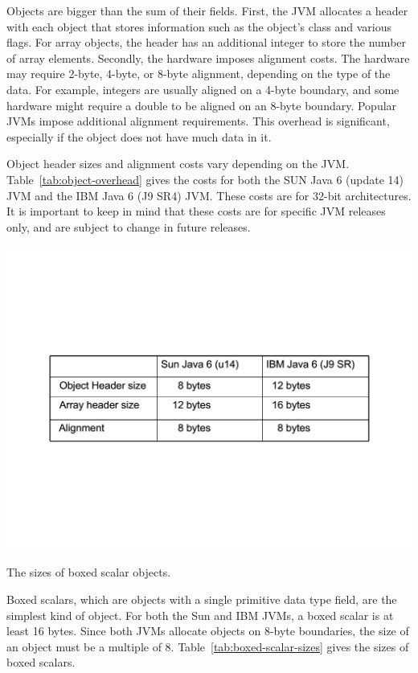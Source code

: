 Objects are bigger than the sum of their fields. First, the JVM allocates a header with each object that stores information such as the object's class and various flags. For array objects, the header has an additional integer to store the number of array elements. Secondly, the hardware imposes alignment costs. The hardware may require 2-byte, 4-byte, or 8-byte alignment, depending on the type of the data. For example, integers are usually aligned on a 4-byte boundary, and some hardware might require a double to be aligned on an 8-byte boundary. Popular JVMs impose additional alignment requirements. This overhead is significant, especially if the object does not have much data in it.

Object header sizes and alignment costs vary depending on the JVM. Table~\ref{tab:object-overhead} gives the costs for both the SUN Java 6 (update 14) JVM and the IBM Java 6 (J9 SR4) JVM. These costs are for 32-bit architectures. It is important to keep in mind that these costs are for specific JVM releases only, and are subject to change in future releases.
\begin{table}
  \centering
 \includegraphics[width=.70\textwidth]{Figures/chapter4/object-overhead.pdf}
  \caption{The sizes of boxed scalar objects.}
  \label{tab:object-overhead}
\end{table} 
 
Boxed scalars, which are objects with a single primitive data type field, are the simplest kind of  object. For both the Sun and IBM JVMs, a boxed scalar is at least 16 bytes. Since both JVMs allocate objects on 8-byte boundaries, the size of an object must be a multiple of 8. Table~\ref{tab:boxed-scalar-sizes} gives the sizes of boxed scalars.

